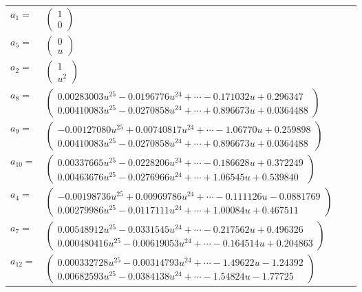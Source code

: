 \documentclass[1p]{elsarticle_modified}
\theoremstyle{definition}
\begin{document}
\begin{tabular}{m{7pt} m{180pt} m{7pt} m{180pt} }
\flushright $a_{1}=$&$\begin{pmatrix}1\\0\end{pmatrix}$ \\
\flushright $a_{5}=$&$\begin{pmatrix}0\\u\end{pmatrix}$ \\
\flushright $a_{2}=$&$\begin{pmatrix}1\\u^2\end{pmatrix}$ \\
\flushright $a_{8}=$&$\begin{pmatrix}0.00283003 u^{25}-0.0196776 u^{24}+\cdots-0.171032 u+0.296347\\0.00410083 u^{25}-0.0270858 u^{24}+\cdots+0.896673 u+0.0364488\end{pmatrix}$ \\
\flushright $a_{9}=$&$\begin{pmatrix}-0.00127080 u^{25}+0.00740817 u^{24}+\cdots-1.06770 u+0.259898\\0.00410083 u^{25}-0.0270858 u^{24}+\cdots+0.896673 u+0.0364488\end{pmatrix}$ \\
\flushright $a_{10}=$&$\begin{pmatrix}0.00337665 u^{25}-0.0228206 u^{24}+\cdots-0.186628 u+0.372249\\0.00463676 u^{25}-0.0276966 u^{24}+\cdots+1.06545 u+0.539840\end{pmatrix}$ \\
\flushright $a_{4}=$&$\begin{pmatrix}-0.00198736 u^{25}+0.00969786 u^{24}+\cdots-0.111126 u-0.0881769\\0.00279986 u^{25}-0.0117111 u^{24}+\cdots+1.00084 u+0.467511\end{pmatrix}$ \\
\flushright $a_{7}=$&$\begin{pmatrix}0.00548912 u^{25}-0.0331545 u^{24}+\cdots-0.217562 u+0.496326\\0.000480416 u^{25}-0.00619053 u^{24}+\cdots-0.164514 u+0.204863\end{pmatrix}$ \\
\flushright $a_{12}=$&$\begin{pmatrix}0.000332728 u^{25}-0.00314793 u^{24}+\cdots-1.49622 u-1.24392\\0.00682593 u^{25}-0.0384138 u^{24}+\cdots-1.54824 u-1.77725\end{pmatrix}$ \\

\end{tabular}
\end{document}
